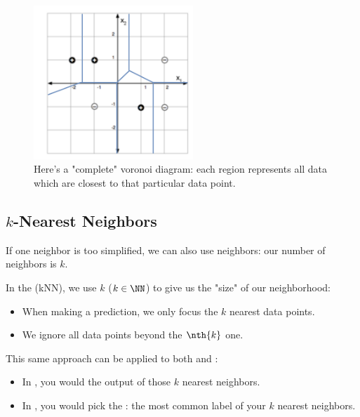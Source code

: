         \begin{figure}[H]
            \centering
            \includegraphics[width=60mm,scale=0.5]{images/nonparametric_images/voronoi_diagram.png}
    
            \caption*{Here's a "complete" voronoi diagram: each region represents all data which are closest to that particular data point.}
        \end{figure}
            
            



    \pagebreak
    

    \subsection{$k$-Nearest Neighbors}

        If one neighbor is too simplified, we can also use  neighbors: our number of neighbors is $k$.\\
    
        \begin{definition}
            In the  (kNN), we use $k$ ($k \in \NN$) to give us the "size" of our neighborhood:
    
            \begin{itemize}
                \item When making a prediction, we only focus the $k$ nearest data points.
                \item We ignore all data points beyond the $\nth{k}$ one.
            \end{itemize}

            \subsecdiv
    
            This same approach can be applied to both  and :
    
            \begin{itemize}
                \item In , you would  the output of those $k$ nearest neighbors.
    
                \item In , you would pick the : the most common label of your $k$ nearest neighbors.
            \end{itemize}
        \end{definition}
    

